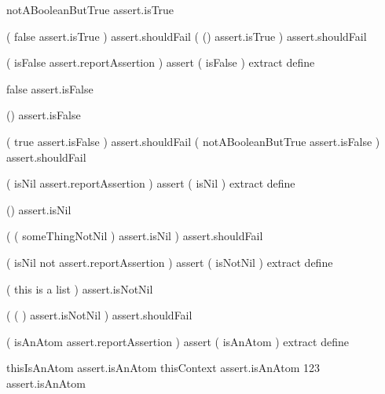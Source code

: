 notABooleanButTrue
assert.isTrue
\stopJoylolTest
\stopTestCase

\startJoylolTest
(
  false
  assert.isTrue 
) assert.shouldFail
(
  ()
  assert.isTrue
) assert.shouldFail
\stopJoylolTest
\stopTestCase
\stopTestSuite


\startJoylolCode
(
  isFalse
  assert.reportAssertion
)
assert
( isFalse ) extract
define
\stopJoylolCode

\startJoylolTest
false
assert.isFalse

()
assert.isFalse
\stopJoylolTest
\stopTestCase

\startJoylolTest
(
  true
  assert.isFalse
) assert.shouldFail
(
  notABooleanButTrue
  assert.isFalse
) assert.shouldFail
\stopJoylolTest
\stopTestCase
\stopTestSuite


\startJoylolCode
(
  isNil
  assert.reportAssertion
)
assert
( isNil ) extract
define
\stopJoylolCode

\startJoylolTest
()
assert.isNil
\stopJoylolTest
\stopTestCase

\startJoylolTest
(
  ( someThingNotNil )
  assert.isNil
) assert.shouldFail
\stopJoylolTest
\stopTestCase

\stopTestSuite


\startJoylolCode
(
  isNil
  not
  assert.reportAssertion
)
assert
( isNotNil ) extract
define
\stopJoylolCode

\startJoylolTest
( this is a list )
assert.isNotNil
\stopJoylolTest
\stopTestCase

\startJoylolTest
(
  ( )
  assert.isNotNil
) assert.shouldFail
\stopJoylolTest
\stopTestCase
\stopTestSuite


\startJoylolCode
(
  isAnAtom
  assert.reportAssertion
)
assert
( isAnAtom ) extract
define
\stopJoylolCode

\startJoylolTest
thisIsAnAtom
assert.isAnAtom
thisContext
assert.isAnAtom
123
assert.isAnAtom
\stopJoylolTest
\stopTestCase

